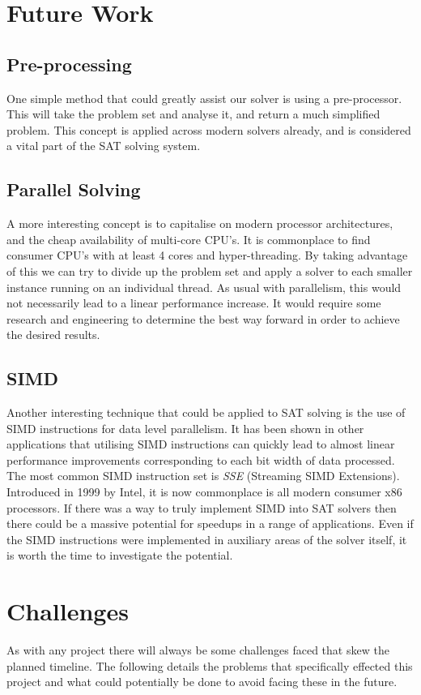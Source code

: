 \documentclass{article}
\begin{document}
\section{Future Work}
\subsection{Pre-processing}
One simple method that could greatly assist our solver is using a pre-processor. This will take the problem set and analyse it,
and return a much simplified problem. This concept is applied across modern solvers already, and is considered a vital part of
the SAT solving system.

\subsection{Parallel Solving}
A more interesting concept is to capitalise on modern processor architectures, and the cheap availability of multi-core CPU's. It
is commonplace to find consumer CPU's with at least 4 cores and hyper-threading. By taking advantage of this we can try to divide
up the problem set and apply a solver to each smaller instance running on an individual thread. As usual with parallelism, this
would not necessarily lead to a linear performance increase. It would require some research and engineering to determine the best
way forward in order to achieve the desired results.

\subsection{SIMD}
Another interesting technique that could be applied to SAT solving is the use of SIMD instructions for data level parallelism. It
has been shown in other applications that utilising SIMD instructions can quickly lead to almost linear performance improvements
corresponding to each bit width of data processed. The most common SIMD instruction set is \textit{SSE} (Streaming SIMD
Extensions). Introduced in 1999 by Intel, it is now commonplace is all modern consumer x86 processors. If there was a way to truly
implement SIMD into SAT solvers then there could be a massive potential for speedups in a range of applications. Even if the SIMD
instructions were implemented in auxiliary areas of the solver itself, it is worth the time to investigate the potential.

\section{Challenges}
As with any project there will always be some challenges faced that skew the planned timeline. The following details the problems
that specifically effected this project and what could potentially be done to avoid facing these in the future.
\end{document}

